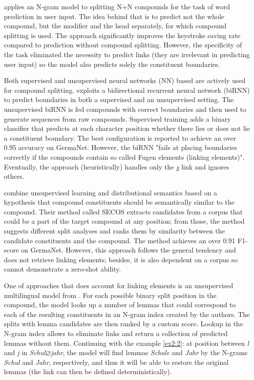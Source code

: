 \documentclass[11pt]{article}
\begin{document}
\citet{baroni:2003} applies an N-gram model to splitting N+N compounds for the task of word prediction in user input. The idea behind that is to predict not the whole compound, but the modifier and the head separately, for which compound splitting is used. The approach significantly improves the keystroke saving rate compared to prediction without compound splitting. However, the specificity of the task eliminated the necessity to predict links (they are irrelevant in predicting user input) so the model also predicts solely the constituent boundaries.

Both supervised and unsupervised neural networks (NN) based are actively used for compound splitting. \citet{Tuggener2018EvaluatingNS} exploits a bidirectional recurrent neural network (biRNN) to predict boundaries in both a supervised and an unsupervised setting. The unsupervised biRNN is fed compounds with correct boundaries and then used to generate sequences from raw compounds. Supervised training adds a binary classifier that predicts at each character position whether there lies or does not lie a constituent boundary. The best configuration is reported to achieve an over 0.95 accuracy on GermaNet. However, the biRNN "fails at placing boundaries correctly if the compounds contain so called Fugen elements (linking elements)". Eventually, the approach (heuristically) handles only the \textit{\underline{s}} link and ignores others.

\citet{riedl-biemann-2016-unsupervised} combine unsupervised learning and distributional semantics based on a hypothesis that compound constituents should be semantically similar to the compound. Their method called SECOS extracts candidates from a corpus that could be a part of the target compound at any position; from those, the method suggests different split analyses and ranks them by similarity between the candidate constituents and the compound. The method achieves an over 0.91 F1-score on GermaNet. However, this approach follows the general tendency and does not retrieve linking elements; besides, it is also dependent on a corpus so cannot demonstrate a zero-shot ability.

One of approaches that does account for linking elements is an unsupervised multilingual model from \citet{ziering-van-der-plas-2016-towards}. For each possible binary split position in the compound, the model looks up a number of lemmas that could correspond to each of the resulting constituents in an N-gram index created by the authors. The splits with lemma candidates are then ranked by a custom score. Lookup in the N-gram index allows to eliminate links and return a collection of predicted lemmas without them. Continuing with the example \ref{ex2:2}: at position between \textit{l} and \textit{j} in \textit{Schul\underline{$\varnothing$}jahr}, the model will find lemmas \textit{Schule} and \textit{Jahr} by the N-grams \textit{Schul} and \textit{Jahr}, respectively, and thus it will be able to restore the original lemmas (the link can then be defined deterministically).
\end{document}
